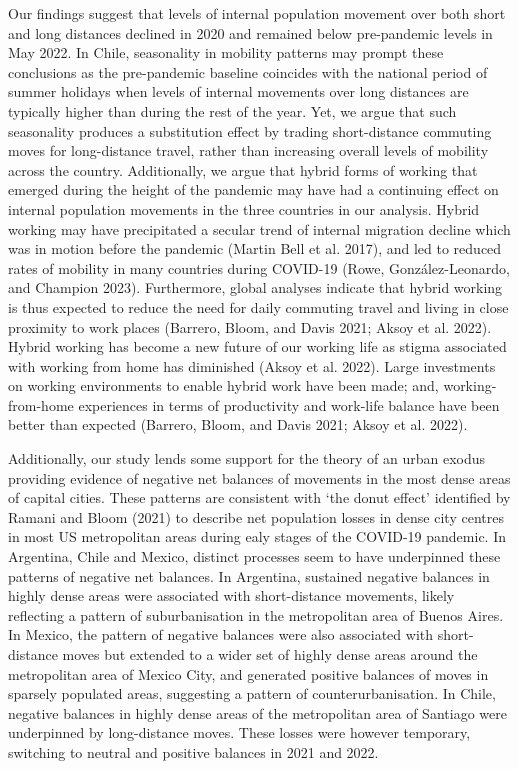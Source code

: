 \documentclass[
  11pt,
]{article}
\begin{document}
Our findings suggest that levels of internal population movement over
both short and long distances declined in 2020 and remained below
pre-pandemic levels in May 2022. In Chile, seasonality in mobility
patterns may prompt these conclusions as the pre-pandemic baseline
coincides with the national period of summer holidays when levels of
internal movements over long distances are typically higher than during
the rest of the year. Yet, we argue that such seasonality produces a
substitution effect by trading short-distance commuting moves for
long-distance travel, rather than increasing overall levels of mobility
across the country. Additionally, we argue that hybrid forms of working
that emerged during the height of the pandemic may have had a continuing
effect on internal population movements in the three countries in our
analysis. Hybrid working may have precipitated a secular trend of
internal migration decline which was in motion before the pandemic
(Martin Bell et al. 2017), and led to reduced rates of mobility in many
countries during COVID-19 (Rowe, González-Leonardo, and Champion 2023).
Furthermore, global analyses indicate that hybrid working is thus
expected to reduce the need for daily commuting travel and living in
close proximity to work places (Barrero, Bloom, and Davis 2021; Aksoy et
al. 2022). Hybrid working has become a new future of our working life as
stigma associated with working from home has diminished (Aksoy et al.
2022). Large investments on working environments to enable hybrid work
have been made; and, working-from-home experiences in terms of
productivity and work-life balance have been better than expected
(Barrero, Bloom, and Davis 2021; Aksoy et al. 2022).

Additionally, our study lends some support for the theory of an urban
exodus providing evidence of negative net balances of movements in the
most dense areas of capital cities. These patterns are consistent with
`the donut effect' identified by Ramani and Bloom (2021) to describe net
population losses in dense city centres in most US metropolitan areas
during ealy stages of the COVID-19 pandemic. In Argentina, Chile and
Mexico, distinct processes seem to have underpinned these patterns of
negative net balances. In Argentina, sustained negative balances in
highly dense areas were associated with short-distance movements, likely
reflecting a pattern of suburbanisation in the metropolitan area of
Buenos Aires. In Mexico, the pattern of negative balances were also
associated with short-distance moves but extended to a wider set of
highly dense areas around the metropolitan area of Mexico City, and
generated positive balances of moves in sparsely populated areas,
suggesting a pattern of counterurbanisation. In Chile, negative balances
in highly dense areas of the metropolitan area of Santiago were
underpinned by long-distance moves. These losses were however temporary,
switching to neutral and positive balances in 2021 and 2022.
\end{document}
